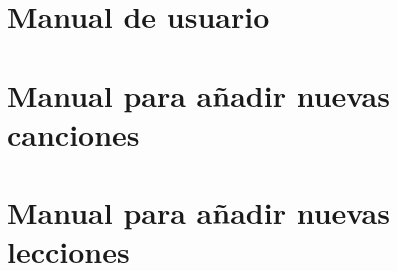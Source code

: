 \documentclass[a4paper,12pt]{scrbook}
\begin{document}
\chapter{Manual de usuario}

\chapter{Manual para añadir nuevas canciones}


\chapter{Manual para añadir nuevas lecciones}









\printindex
\end{document}
